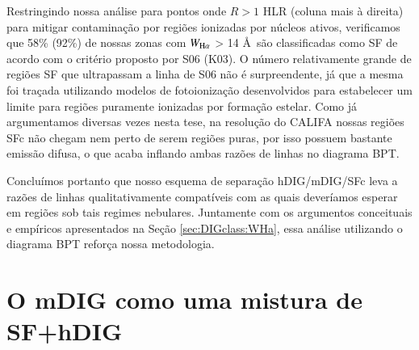 Restringindo nossa análise para pontos onde $R > 1$ HLR (coluna mais à direita) para mitigar contaminação por regiões ionizadas por núcleos ativos, verificamos que 58\% (92\%) de nossas zonas com $W_{\Ha}$ > 14 \AA\ são classificadas como SF de acordo com o critério proposto por S06 (K03). O número relativamente grande de regiões SF que ultrapassam a linha de S06 não é surpreendente, já que a mesma foi traçada utilizando modelos de fotoionização desenvolvidos para estabelecer um limite para regiões puramente ionizadas por formação estelar. Como já argumentamos diversas vezes nesta tese, na resolução do CALIFA nossas regiões SFc não chegam nem perto de serem regiões \hii puras, por isso possuem bastante emissão difusa, o que acaba inflando ambas razões de linhas no diagrama BPT.

Concluímos portanto que nosso esquema de separação hDIG/mDIG/SFc leva a razões de linhas qualitativamente compatíveis com as quais deveríamos esperar em regiões sob tais regimes nebulares. Juntamente com os argumentos conceituais e empíricos apresentados na Seção \ref{sec:DIGclass:WHa}, essa análise utilizando o diagrama BPT reforça nossa metodologia.


\section{O mDIG como uma mistura de SF+hDIG}
\label{sec:DIGdisc:mDIG}

